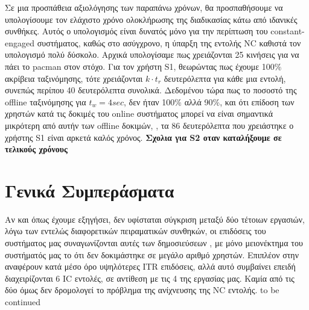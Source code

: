\documentclass[11pt,a4paper,english,greek,twoside]{../Thesis}
\begin{document}
\par Σε μια προσπάθεια αξιολόγησης των παραπάνω χρόνων, θα προσπαθήσουμε να υπολογίσουμε τον ελάχιστο χρόνο ολοκλήρωσης της διαδικασίας κάτω από ιδανικές συνθήκες. Αυτός ο υπολογισμός είναι δυνατός μόνο για την περίπτωση του constant-engaged συστήματος, καθώς στο ασύγχρονο, η ύπαρξη της εντολής NC καθιστά τον υπολογισμό πολύ δύσκολο. Αρχικά υπολογίσαμε πως χρειάζονται 25 κινήσεις για να πάει το pacman στον στόχο. Για τον χρήστη S1, θεωρώντας πως έχουμε 100\% ακρίβεια ταξινόμησης, τότε χρειάζονται $k\cdot t_r$ δευτερόλεπτα για κάθε μια εντολή, συνεπώς περίπου 40 δευτερόλεπτα συνολικά. Δεδομένου τώρα πως το ποσοστό της offline ταξινόμησης για $t_w=4sec$, δεν ήταν 100\% αλλά 90\%, και ότι επίδοση των χρηστών κατά τις δοκιμές του online συστήματος μπορεί να είναι σημαντικά μικρότερη από αυτήν των offline δοκιμών, \cite{Muller-Putz2006-wj} \cite{Yuan2013-jp}, τα 86 δευτερόλεπτα που χρειάστηκε ο χρήστης S1 είναι αρκετά καλός χρόνος. \textbf{Σχολια για S2 οταν καταλήξουμε σε τελικούς χρόνους}

\section{Γενικά Συμπεράσματα}
Αν και όπως έχουμε εξηγήσει, δεν υφίσταται σύγκριση μεταξύ δύο τέτοιων εργασιών, λόγω των εντελώς διαφορετικών πειραματικών συνθηκών,
οι επιδόσεις του συστήματος μας συναγωνίζονται αυτές των δημοσιεύσεων \cite{Lin2014-cp}\cite{Liu2012-qj}, με μόνο μειονέκτημα του συστήματός μας το ότι δεν δοκιμάστηκε σε μεγάλο αριθμό χρηστών. Επιπλέον στην  \cite{Liu2012-qj} αναφέρουν κατά μέσο όρο υψηλότερες ITR επιδόσεις, αλλά αυτό συμβαίνει επειδή διαχειρίζονται 6 IC εντολές, σε αντίθεση με τις 4 της εργασίας μας. Καμία από τις δύο όμως δεν δρομολογεί το πρόβλημα της ανίχνευσης της NC εντολής.
to be continued 

\end{document}
